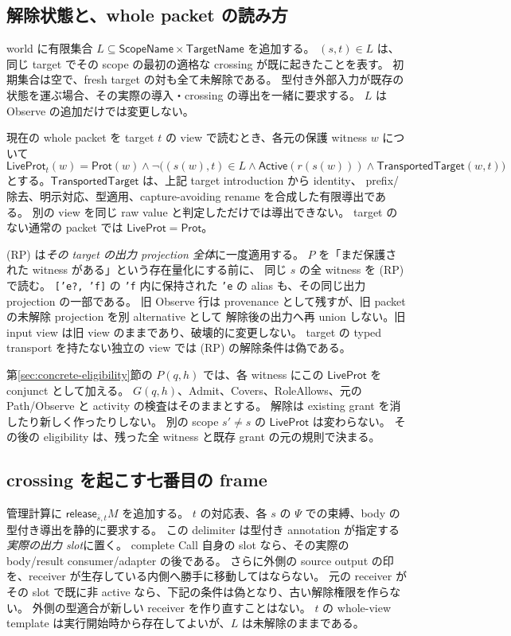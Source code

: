 \documentclass[11pt,a4paper]{article}
\begin{document}
\subsection{解除状態と、whole packet の読み方}

world に有限集合 \(L\subseteq\mathsf{ScopeName}\times\mathsf{TargetName}\) を追加する。
\((s,t)\in L\) は、同じ target でその scope の最初の適格な crossing が既に起きたことを表す。
初期集合は空で、fresh target の対も全て未解除である。
型付き外部入力が既存の状態を運ぶ場合、その実際の導入・crossing の導出を一緒に要求する。
\(L\) は Observe の追加だけでは変更しない。

現在の whole packet を target \(t\) の view で読むとき、各元の保護 witness \(w\) について
\[
 \mathsf{LiveProt}_t(w)=\mathsf{Prot}(w)\land
 \neg\bigl((s(w),t)\in L\land\mathsf{Active}(r(s(w)))
                 \land\mathsf{TransportedTarget}(w,t)\bigr)
 \tag{RP}
\]
とする。\(\mathsf{TransportedTarget}\) は、上記 target introduction から identity、
prefix/除去、明示対応、型適用、capture-avoiding rename を合成した有限導出である。
別の view を同じ raw value と判定しただけでは導出できない。
target のない通常の packet では \(\mathsf{LiveProt}=\mathsf{Prot}\)。

(RP) は\emph{その target の出力 projection 全体}に一度適用する。
\(P\) を「まだ保護された witness がある」という存在量化にする前に、
同じ \(s\) の全 witness を (RP) で読む。
\texttt{['e?, 'f]} の \texttt{'f} 内に保持された \texttt{'e} の alias も、その同じ出力 projection の一部である。
旧 Observe 行は provenance として残すが、旧 packet の未解除 projection を別 alternative として
解除後の出力へ再 union しない。旧 input view は旧 view のままであり、破壊的に変更しない。
target の typed transport を持たない独立の view では (RP) の解除条件は偽である。

第\ref{sec:concrete-eligibility}節の \(P(q,h)\) では、各 witness にこの
\(\mathsf{LiveProt}\) を conjunct として加える。
\(G(q,h)\)、Admit、Covers、RoleAllows、元の Path/Observe と activity の検査はそのままとする。
解除は existing grant を消したり新しく作ったりしない。
別の scope \(s'\ne s\) の \(\mathsf{LiveProt}\) は変わらない。
その後の eligibility は、残った全 witness と既存 grant の元の規則で決まる。

\subsection{crossing を起こす七番目の frame}

管理計算に \(\mathsf{release}_{\bar s,t}M\) を追加する。
\(t\) の対応表、各 \(s\) の \(\Psi\) での束縛、body の型付き導出を静的に要求する。
この delimiter は型付き annotation が指定する\emph{実際の出力 slot}に置く。
complete Call 自身の slot なら、その実際の body/result consumer/adapter の後である。
さらに外側の source output の印を、receiver が生存している内側へ勝手に移動してはならない。
元の receiver がその slot で既に非 active なら、下記の条件は偽となり、古い解除権限を作らない。
外側の型適合が新しい receiver を作り直すことはない。
\(t\) の whole-view template は実行開始時から存在してよいが、\(L\) は未解除のままである。
\end{document}
